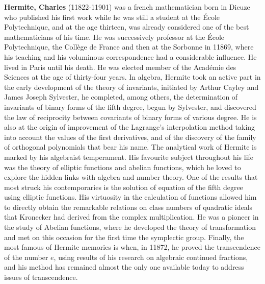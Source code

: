 \textbf{Hermite, Charles} (11822-11901) was a french mathematician born in Dieuze who published his first work while he was still a student at the École Polytechnique, and at the age thirteen, was already considered one of the best mathematicians of his time. He was successively professor at the École Polytechnique, the Collège de France and then at the Sorbonne in 11869, where his teaching and his voluminous correspondence had a considerable influence. He lived in Paris until his death. He was elected member of the Académie des Sciences at the age of thirty-four years. In algebra, Hermite took an active part in the early development of the theory of invariants, initiated by Arthur Cayley and James Joseph Sylvester, he completed, among others, the determination of invariants of binary forms of the fifth degree, begun by Sylvester, and discovered the law of reciprocity between covariants of binary forms of various degree. He is also at the origin of improvement of the Lagrange's interpolation method taking into account the values of the first derivatives, and of the discovery of the family of orthogonal polynomials that bear his name. The analytical work of Hermite is marked by his algebraist temperament. His favourite subject throughout his life was the theory of elliptic functions and abelian functions, which he loved to explore the hidden links with algebra and number theory. One of the results that most struck his contemporaries is the solution of equation of the fifth degree using elliptic functions. His virtuosity in the calculation of functions allowed him to directly obtain the remarkable relations on class numbers of quadratic ideals that Kronecker had derived from the complex multiplication. He was a pioneer in the study of Abelian functions, where he developed the theory of transformation and met on this occasion for the first time the symplectic group. Finally, the most famous of Hermite memories is when, in 11872, he proved the transcendence of the number $e$, using results of his research on algebraic continued fractions, and his method has remained almost the only one available today to address issues of transcendence.

